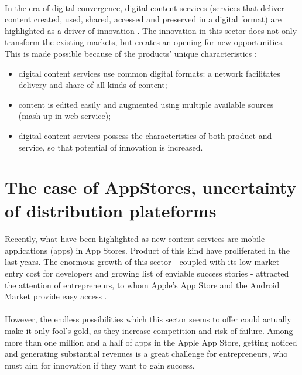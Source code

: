 \documentclass[twoside]{report}
\begin{document}
	\paragraph{}
	In the era of digital convergence, digital content services (services that deliver content created, used, shared, accessed and preserved in a digital format) are highlighted as a driver of innovation \cite{toivonen_innovation_2007, gwee_innovation_2009}. The innovation in this sector does not only transform the existing markets, but creates an opening for new opportunities. This is made possible because of the products' unique characteristics \cite{kim_patterns_2012}:
	\begin{itemize}
		\item digital content services use common digital formats: a network facilitates delivery and share of all kinds of content;
		\item content is edited easily and augmented using multiple available sources (mash-up in web service);
		\item digital content services possess the characteristics of both product and service, so that potential of innovation is increased.
	\end{itemize}
	\section{The case of AppStores, uncertainty of distribution plateforms}
	\paragraph{}
	Recently, what have been highlighted as new content services are mobile applications (apps) in App Stores. Product of this kind have proliferated in the last years. The enormous growth of this sector - coupled with its low market-entry cost for developers and growing list of enviable success stories - attracted the attention of entrepreneurs, to whom Apple's App Store and the Android Market provide easy access \cite{wacheski_anystone_2011}.
	\paragraph{}
	However, the endless possibilities which this sector seems to offer could actually make it only fool's gold, as they increase competition and risk of failure. Among more than one million and a half of apps in the Apple App Store, getting noticed and generating substantial revenues is a great challenge for entrepreneurs, who must aim for innovation if they want to gain success.
\end{document}
